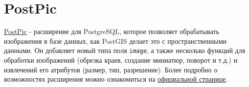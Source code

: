 \section{PostPic}

\href{http://drotiro.github.io/postpic/}{PostPic} - расширение для PostgreSQL, которое позволяет обрабатывать изображения в базе данных, как PostGIS делает это с пространственными данными. Он добавляет новый типа поля \lstinline!image!, а также несколько функций для обработки изображений (обрезка краев, создание миниатюр, поворот и т.д.) и извлечений его атрибутов (размер, тип, разрешение). Более подробно о возможностях расширения можно ознакомиться на \href{https://github.com/drotiro/postpic/wiki/SQL-Functions-Guide}{официальной странице}.
